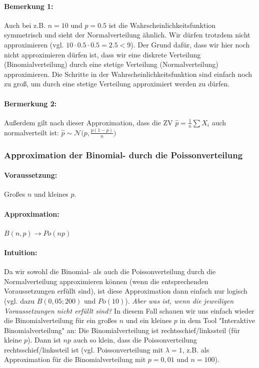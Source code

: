 \documentclass[a4paper]{article}
\begin{document}
\paragraph{Bemerkung 1:} Auch bei z.B. $n=10$ und $p=0.5$ ist die Wahrscheinlichkeitsfunktion symmetrisch und sieht der Normalverteilung ähnlich. Wir dürfen trotzdem nicht approximieren (vgl. $10\cdot0.5\cdot0.5=2.5<9$). Der Grund dafür, dass wir hier noch nicht approximieren dürfen ist, dass wir eine diskrete Verteilung (Binomialverteilung) durch eine stetige Verteilung (Normalverteilung) approximieren. Die Schritte in der Wahrscheinlichkeitsfunktion sind einfach noch zu groß, um durch eine stetige Verteilung approximiert werden zu dürfen.
\paragraph{Bermerkung 2:} Außerdem gilt nach dieser Approximation, dass die ZV $\hat{p}=\frac{1}{n} \sum X_i$ auch normalverteilt ist: $\hat{p} \sim \mathcal{N}\Big(p,\frac{p(1-p)}{n}\Big)$

\subsubsection{Approximation der Binomial- durch die Poissonverteilung}\label{sec:BinPo}

\paragraph{Voraussetzung:} Großes $n$ und kleines $p$.
\paragraph{Approximation:} $B(n,p) \rightarrow Po(np)$
\paragraph{Intuition:} Da wir sowohl die Binomial- als auch die Poissonverteilung durch die Normalverteilung approximieren können (wenn die entsprechenden Voraussetzungen erfüllt sind), ist diese Approximation dann einfach nur logisch (vgl. dazu $B(0,05;200)$ und $Po(10)$). \textit{Aber was ist, wenn die jeweiligen Voraussetzungen nicht erfüllt sind?} In diesem Fall schauen wir uns einfach wieder die Binomialverteilung für ein großes $n$ und ein kleines $p$ in dem Tool "Interaktive Binomialverteilung" an: 
	 Die Binomialverteilung ist rechtsschief/linkssteil (für kleine $p$). Dann ist $np$ auch so klein, dass die Poissonverteilung rechtsschief/linkssteil ist (vgl. Poissonverteilung mit $\lambda=1$, z.B. als Approximation für die Binomialverteilung mit $p=0,01$ und $n=100$).
\end{document}
